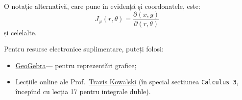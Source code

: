O notație alternativă, care pune în evidență și coordonatele, este:
\[
  J_\varphi(r, \theta) = \frac{\partial (x, y)}{\partial (r, \theta)}
\]
și celelalte.

\begin{remark}\label{rk:geo-kow}
  Pentru resurse electronice suplimentare, puteți folosi:
  \begin{itemize}
  \item \href{https://www.geogebra.org/}{GeoGebra}\faLink --- pentru reprezentări grafice;
  \item Lecțiile online ale  Prof.\ \href{https://www.youtube.com/watch?v=le1JlwBkAog\&list=PLE7F8F33E161D1425\&index=23}{Travis Kowalski} \faYoutube
    (în special secțiunea \texttt{Calculus 3}, începînd cu lecția 17 pentru integrale duble).
  \end{itemize}
\end{remark}

